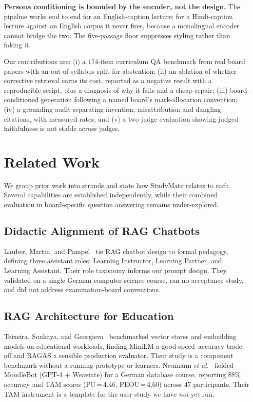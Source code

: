 \documentclass[conference]{IEEEtran}
\begin{document}
\textbf{Persona conditioning is bounded by the encoder, not the design.} The
pipeline works end to end for an English-caption lecture; for a Hindi-caption
lecture against an English corpus it never fires, because a monolingual encoder
cannot bridge the two. The five-passage floor suppresses styling rather than
faking it.

Our contributions are: (i) a $174$-item curriculum QA benchmark from
real board papers with an out-of-syllabus split for abstention; (ii) an
ablation of whether corrective retrieval earns its cost, reported as a negative
result with a reproducible script, plus a diagnosis of why it fails and a cheap
repair; (iii) board-conditioned generation following a named board's
mark-allocation convention; (iv) a grounding audit separating invention,
misattribution and dangling citations, with measured rates; and (v) a
two-judge evaluation showing judged faithfulness is not stable across
judges.

\section{Related Work}
We group prior work into strands and state how StudyMate relates to each.
Several capabilities are established independently, while their combined
evaluation in board-specific question answering remains under-explored.

\subsection{Didactic Alignment of RAG Chatbots}
Lauber, Martin, and Pampel~\cite{lauber2025} tie RAG chatbot design to formal
pedagogy, defining three assistant roles: Learning Instructor, Learning Partner,
and Learning Assistant. Their role taxonomy informs our prompt design. They
validated on a single German computer-science course, ran no acceptance study,
and did not address examination-board conventions.

\subsection{RAG Architecture for Education}
Teixeira, Sonkaya, and Georgieva~\cite{teixeira2025} benchmarked vector stores
and embedding models on educational workloads, finding MiniLM a good
speed--accuracy trade-off and RAGAS a sensible production evaluator. Their study
is a component benchmark without a running prototype or learners.
Neumann \textit{et al.}~\cite{neumann2025} fielded MoodleBot (GPT-4 + Weaviate)
for a German database course, reporting $88\%$ accuracy and TAM scores
(PU\,=\,4.46, PEOU\,=\,4.60) across $47$ participants. Their TAM instrument is a
template for the user study we have \emph{not} yet run.
\end{document}
